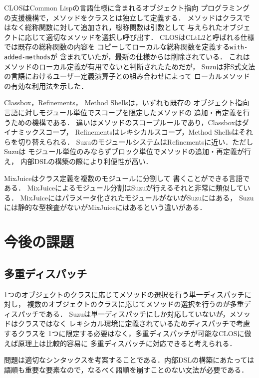 \documentclass[a4paper,11pt,dvipdfmx]{jreport}
\begin{document}
CLOS\cite{CLOS}はCommon Lispの言語仕様に含まれるオブジェクト指向
プログラミングの支援機構で，メソッドをクラスとは独立して定義する．
メソッドはクラスではなく総称関数に対して追加され，総称関数は引数として
与えられたオブジェクトに応じて適切なメソッドを選択し呼び出す．
CLOSはCLtL2\cite{CLtL2}と呼ばれる仕様では既存の総称関数の内容を
コピーしてローカルな総称関数を定義する\verb|with-added-methods|が
含まれていたが，最新の仕様からは削除されている．
これはメソッドのローカル定義が有用でないと判断されたためだが，
Suzuは非S式文法の言語におけるユーザー定義演算子との組み合わせによって
ローカルメソッドの有効な利用法を示した．

Classbox\cite{Classboxes}，Refinements\cite{Refinements}，
Method Shells\cite{MethodShells}は，いずれも既存の
オブジェクト指向言語に対しモジュール単位でスコープを限定したメソッドの
追加・再定義を行うための機構である．
違いはメソッドのスコープルールであり，Classboxはダイナミックスコープ，
Refinementsはレキシカルスコープ，Method Shellsはそれらを切り替えられる．
SuzuのモジュールシステムはRefinementsに近い．ただしSuzuは
モジュール単位のみならずブロック単位でメソッドの追加・再定義が行え，
内部DSLの構築の際により利便性が高い．

MixJuice\cite{MixJuice}はクラス定義を複数のモジュールに分割して
書くことができる言語である．
MixJuiceによるモジュール分割はSuzuが行えるそれと非常に類似している．
MixJuiceにはパラメータ化されたモジュールがないがSuzuにはある，
Suzuには静的な型検査がないがMixJuiceにはあるという違いがある．


\chapter{今後の課題}
\label{chapter:future-work}

\section{多重ディスパッチ}

1つのオブジェクトのクラスに応じてメソッドの選択を行う単一ディスパッチに対し，
複数のオブジェクトのクラスに応じてメソッドの選択を行うのが多重ディスパッチである．
Suzuは単一ディスパッチにしか対応していないが，メソッドはクラスではなく
レキシカル環境に定義されているためディスパッチで考慮するクラスを
1つに限定する必要はなく，多重ディスパッチが可能なCLOSに倣えば原理上は比較的容易に
多重ディスパッチに対応できると考えられる．

問題は適切なシンタックスを考案することである．内部DSLの構築にあたっては
語順も重要な要素なので，なるべく語順を崩すことのない文法が必要である．
\end{document}
